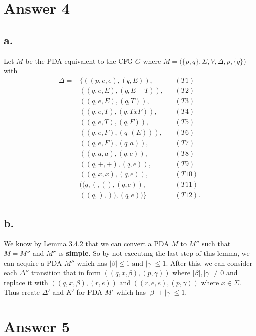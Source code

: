\documentclass[12pt]{article}
\begin{document}
\section*{Answer 4}

\subsection*{a.}
	Let $M$ be the PDA equivalent to the CFG $G$ where $M = \Big(\{p,q\}, \Sigma, V, \Delta, p, \{q\}\Big)$ with
		\begin{align*}
			\Delta = & \{((p,e,e),(q,E)), & & (T1)  \\
							 & ((q,e,E),(q,E+T)), & & (T2)  \\
							 & ((q,e,E),(q,T)),   & & (T3)  \\
							 & ((q,e,T),(q,TxF)), & & (T4)  \\
							 & ((q,e,T),(q,F)),   & & (T5)  \\
							 & ((q,e,F),(q,(E))), & & (T6)  \\
							 & ((q,e,F),(q,a)),   & & (T7)  \\
							 & ((q,a,a),(q,e)),   & & (T8)  \\
							 & ((q,+,+),(q,e)),   & & (T9)  \\
							 & ((q,x,x),(q,e)),   & & (T10) \\
							 & ((q,(,(),(q,e)),   & & (T11) \\
							 & ((q,),)),(q,e))\}  & & (T12).
		\end{align*}

\subsection*{b.}
		\qquad We know by Lemma 3.4.2 that we can convert a PDA $M$ to $M''$ such that $M = M''$ and $M''$ is \textbf{simple}. So by not executing the last step of this lemma, we can acquire a PDA $M''$ which has $|\beta| \leq 1 \text{ and } |\gamma| \leq 1$. After this, we can consider each $\Delta''$ transition that in form $((q,x,\beta), (p, \gamma))$ where $|\beta|,|\gamma| \neq 0$ and replace it with $((q,x,\beta), (r, e)) \text{ and } ((r,e,e), (p, \gamma))$ where $x \in \Sigma$. Thus create $\Delta'$ and $K'$ for PDA $M'$ which has $|\beta|+|\gamma| \leq 1$.


\section*{Answer 5}
\end{document}
